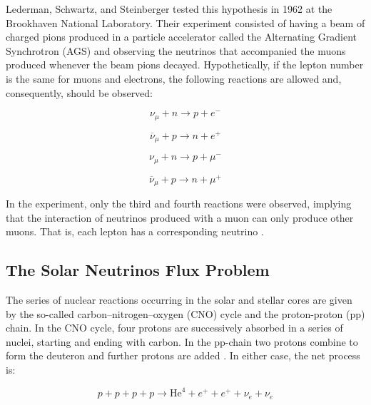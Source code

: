 Lederman, Schwartz, and Steinberger tested this hypothesis in 1962 at the Brookhaven National Laboratory. Their experiment consisted of having a beam of charged pions produced in a particle accelerator called the Alternating Gradient Synchrotron (AGS) and observing the neutrinos that accompanied the muons produced whenever the beam pions decayed. Hypothetically, if the lepton number is the same for muons and electrons, the following reactions are allowed and, consequently, should be observed: 

\begin{equation}
	\nu_{\mu} + n \longrightarrow p + e^-
	\label{lss_primeira}
\end{equation}

\begin{equation}
	\overline{\nu}_{\mu} + p \longrightarrow n + e^+
	\label{lss_segunda}
\end{equation}

\begin{equation}
	\nu_{\mu} + n \longrightarrow p + \mu^-
	\label{lss_terceira}
\end{equation}
 
\begin{equation}
	\overline{\nu}_{\mu} + p \longrightarrow n + \mu^+
	\label{lss_quarta}
\end{equation}

In the experiment, only the third and fourth reactions were observed, implying that the interaction of neutrinos produced with a muon can only produce other muons. That is, each lepton has a corresponding neutrino \cite{two_neutrinos}.

\subsection{The Solar Neutrinos Flux Problem}
The series of nuclear reactions occurring in the solar and stellar cores are given by the so-called carbon–nitrogen–oxygen (CNO) cycle and the proton-proton (pp) chain. In the CNO cycle, four protons are successively absorbed in a series of nuclei, starting and ending with carbon. In the pp-chain two protons combine to form the deuteron and further protons are added \cite{the_story_of_the_neutrino}. In either case, the net process is:

\begin{equation}
	p+p+p+p \longrightarrow \textrm{He}^4 +e^+ + e^+ +\nu_e +\nu_e
	\label{solar_reaction}
\end{equation}

